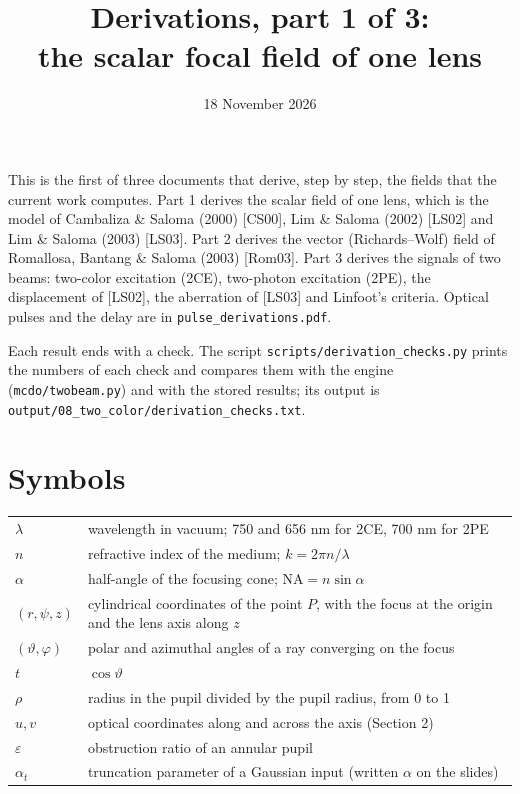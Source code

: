 \documentclass[11pt]{article}
\title{Derivations, part 1 of 3:\\ the scalar focal field of one lens}
\date{18 November 2026}
\author{}
\begin{document}
\maketitle
\vspace{-2.5em}

This is the first of three documents that derive, step by step, the fields that the current work computes. Part 1
derives the scalar field of one lens, which is the model of Cambaliza \& Saloma (2000) [CS00], Lim \& Saloma (2002)
[LS02] and Lim \& Saloma (2003) [LS03]. Part 2 derives the vector (Richards--Wolf) field of Romallosa, Bantang \&
Saloma (2003) [Rom03]. Part 3 derives the signals of two beams: two-color excitation (2CE), two-photon excitation
(2PE), the displacement of [LS02], the aberration of [LS03] and Linfoot's criteria. Optical pulses and the delay are
in \texttt{pulse\_derivations.pdf}.

Each result ends with a check. The script \texttt{scripts/derivation\_checks.py} prints the numbers of each check
and compares them with the engine (\texttt{mcdo/twobeam.py}) and with the stored results; its output is
\texttt{output/08\_two\_color/}\allowbreak\texttt{derivation\_checks.txt}.

\section*{Symbols}
\begin{center}\small\begin{tabular}{ll}\toprule
$\lambda$ & wavelength in vacuum; 750 and 656 nm for 2CE, 700 nm for 2PE\\
$n$ & refractive index of the medium; $k = 2\pi n/\lambda$\\
$\alpha$ & half-angle of the focusing cone; $\mathrm{NA} = n\sin\alpha$\\
$(r, \psi, z)$ & cylindrical coordinates of the point $P$, with the focus at the origin and the lens axis along $z$\\
$(\vartheta, \varphi)$ & polar and azimuthal angles of a ray converging on the focus\\
$t$ & $\cos\vartheta$\\
$\rho$ & radius in the pupil divided by the pupil radius, from 0 to 1\\
$u, v$ & optical coordinates along and across the axis (Section 2)\\
$\varepsilon$ & obstruction ratio of an annular pupil\\
$\alpha_t$ & truncation parameter of a Gaussian input (written $\alpha$ on the slides)\\\bottomrule
\end{tabular}\end{center}
\end{document}
